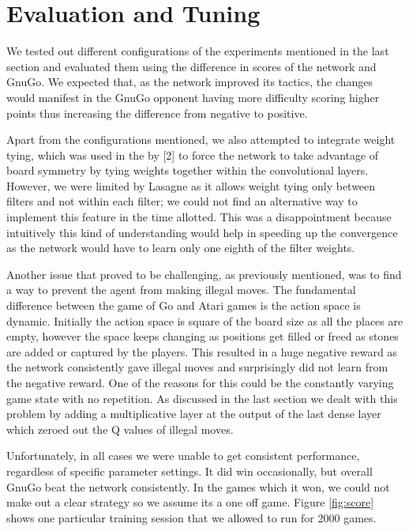 \section{Evaluation and Tuning}

We tested out different configurations of the experiments mentioned in the last section and evaluated them using the difference in scores of the network and GnuGo. We expected that, as the network improved its tactics, the changes would manifest in the GnuGo opponent having more difficulty scoring higher points thus increasing the difference from negative to positive.

Apart from the configurations mentioned, we also attempted to integrate weight tying, which was used in the by [2] to force the network to take advantage of board symmetry by tying weights together within the convolutional layers. However, we were limited by Lasagne as it allows weight tying only between filters and not within each filter; we could not find an alternative way to implement this feature in the time allotted. This was a disappointment because intuitively this kind of understanding would help in speeding up the convergence as the network would have to learn only one eighth of the filter weights. 

Another issue that proved to be challenging, as previously mentioned, was to find a way to prevent the agent from making illegal moves. The fundamental difference between the game of Go and Atari games is the action space is dynamic. Initially the action space is square of the board size as all the places are empty, however the space keeps changing as positions get filled or freed as stones are added or captured by the players. This resulted in a huge negative reward as the network consistently gave illegal moves and surprisingly did not learn from the negative reward. One of the reasons for this could be the constantly varying game state with no repetition. As discussed in the last section we dealt with this problem by adding a multiplicative layer at the output of the last dense layer which zeroed out the Q values of illegal moves.  

Unfortunately, in all cases we were unable to get consistent performance, regardless of specific parameter settings. It did win occasionally, but overall GnuGo beat the network consistently. In the games which it won, we could not make out a clear strategy so we assume its a one off game. Figure \ref{fig:score} shows one particular training session that we allowed to run for 2000 games. 

